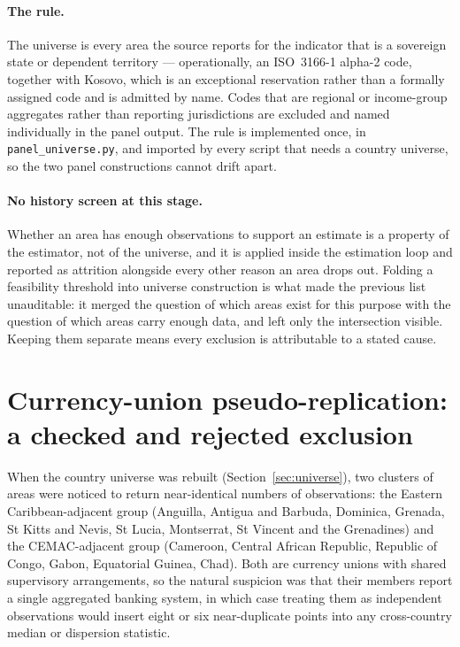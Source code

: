\documentclass[11pt]{article}
\begin{document}
\paragraph{The rule.} The universe is every area the source reports for
the indicator that is a sovereign state or dependent territory ---
operationally, an ISO~3166-1 alpha-2 code, together with Kosovo, which is
an exceptional reservation rather than a formally assigned code and is
admitted by name. Codes that are regional or income-group aggregates
rather than reporting jurisdictions are excluded and named individually in
the panel output. The rule is implemented once, in
\texttt{panel\_universe.py}, and imported by every script that needs a
country universe, so the two panel constructions cannot drift apart.

\paragraph{No history screen at this stage.} Whether an area has enough
observations to support an estimate is a property of the estimator, not of
the universe, and it is applied inside the estimation loop and reported as
attrition alongside every other reason an area drops out. Folding a
feasibility threshold into universe construction is what made the previous
list unauditable: it merged the question of which areas exist for this
purpose with the question of which areas carry enough data, and left only
the intersection visible. Keeping them separate means every exclusion is
attributable to a stated cause.

\section{Currency-union pseudo-replication: a checked and rejected
exclusion}

When the country universe was rebuilt (Section~\ref{sec:universe}), two
clusters of areas were noticed to return near-identical numbers of
observations: the Eastern Caribbean-adjacent group (Anguilla, Antigua and
Barbuda, Dominica, Grenada, St Kitts and Nevis, St Lucia, Montserrat, St
Vincent and the Grenadines) and the CEMAC-adjacent group (Cameroon,
Central African Republic, Republic of Congo, Gabon, Equatorial Guinea,
Chad). Both are currency unions with shared supervisory arrangements, so
the natural suspicion was that their members report a single aggregated
banking system, in which case treating them as independent observations
would insert eight or six near-duplicate points into any cross-country
median or dispersion statistic.
\end{document}
